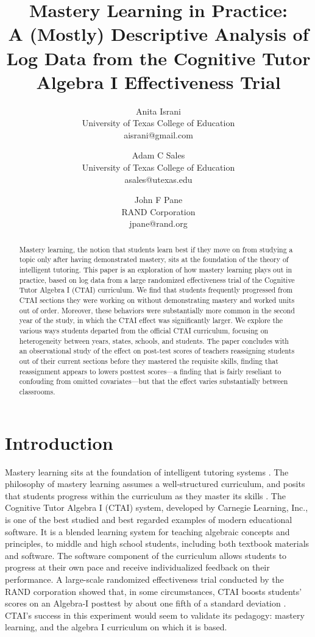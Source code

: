 \documentclass[notitlepage,12pt]{jedm}\usepackage[]{graphicx}\usepackage[]{color}
\title{Mastery Learning in Practice:\\
A (Mostly) Descriptive Analysis of Log Data from the Cognitive Tutor Algebra I Effectiveness Trial}
\author{{\large Anita Israni}\\University of Texas College of
  Education\\aisrani@gmail.com \and {\large Adam C Sales}\\University of Texas College of
  Education\\asales@utexas.edu  \and {\large John F Pane}\\RAND Corporation\\jpane@rand.org}
\date{}
\begin{document}
\maketitle

\begin{abstract}
Mastery learning, the notion that students learn best if they move on
from studying a topic only after having demonstrated mastery, sits at
the foundation of the theory of intelligent tutoring. This paper is an
exploration of how mastery learning plays out in practice, based on
log data from a large randomized effectiveness trial of the Cognitive
Tutor Algebra I (CTAI) curriculum. We find that students frequently
progressed from CTAI sections they were working on without
demonstrating mastery and worked units out of order. Moreover, these
behaviors were substantially more common in the second year of the
study, in which the CTAI effect was significantly larger. We explore
the various ways students departed from the official CTAI curriculum,
focusing on heterogeneity between years, states, schools, and
students. The paper concludes with an observational study of the
effect on post-test scores of teachers reassigning students out of
their current sections before they mastered the requisite skills,
finding that reassignment appears to lowers posttest scores---a finding
that is fairly reseliant to confouding from omitted
covariates---but that the effect varies substantially between
classrooms.
\end{abstract}
\section{Introduction}
Mastery learning sits at the foundation of intelligent tutoring
systems \cite[e.g.][]{corbett2001cognitive,wenger2014artificial}.
The philosophy of mastery learning assumes a well-structured
curriculum, and posits that students progress within the curriculum as
they master its skills
\cite{bloom1968learning,kulik1990effectiveness}. The Cognitive Tutor
Algebra I (CTAI) system, developed by Carnegie Learning, Inc., is one of the best studied and best regarded examples of modern educational software. It is a blended learning system for teaching algebraic concepts and principles, to middle and high school students, including both textbook materials and software. The software component of the curriculum allows students to progress at their own pace and receive individualized feedback on their performance. A large-scale randomized effectiveness trial conducted by the RAND corporation showed that, in some circumstances, CTAI boosts students' scores on an Algebra-I posttest by about one fifth of a standard deviation \cite{pane2014effectiveness}. CTAI's success in this experiment would seem to validate its pedagogy: mastery learning, and the algebra I curriculum on which it is based.
\end{document}
